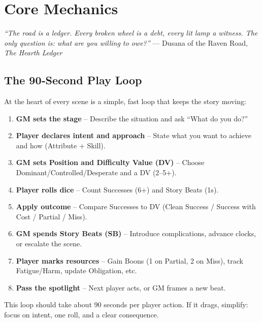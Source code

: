 \chapter{Core Mechanics}
\label{ch:core-mechanics}

\begin{tcolorbox}[colback=black!3!white,colframe=black!40!white,title=A Word from the Raven Road]
\emph{“The road is a ledger. Every broken wheel is a debt, every lit lamp a witness. The only question is: what are you willing to owe?”}  
\vspace{0.2cm}\hfill — Dusana of the Raven Road, \textit{The Hearth Ledger}
\end{tcolorbox}

\section{The 90‑Second Play Loop}
\label{sec:play-loop}

At the heart of every scene is a simple, fast loop that keeps the story moving:

\begin{enumerate}
  \item \textbf{GM sets the stage} – Describe the situation and ask “What do you do?”
  \item \textbf{Player declares intent and approach} – State what you want to achieve and how (Attribute + Skill).
  \item \textbf{GM sets Position and Difficulty Value (DV)} – Choose Dominant/Controlled/Desperate and a DV (2–5+).
  \item \textbf{Player rolls dice} – Count Successes (6+) and Story Beats (1s).
  \item \textbf{Apply outcome} – Compare Successes to DV (Clean Success / Success with Cost / Partial / Miss).
  \item \textbf{GM spends Story Beats (SB)} – Introduce complications, advance clocks, or escalate the scene.
  \item \textbf{Player marks resources} – Gain Boons (1 on Partial, 2 on Miss), track Fatigue/Harm, update Obligation, etc.
  \item \textbf{Pass the spotlight} – Next player acts, or GM frames a new beat.
\end{enumerate}

This loop should take about 90 seconds per player action. If it drags, simplify: focus on intent, one roll, and a clear consequence.

